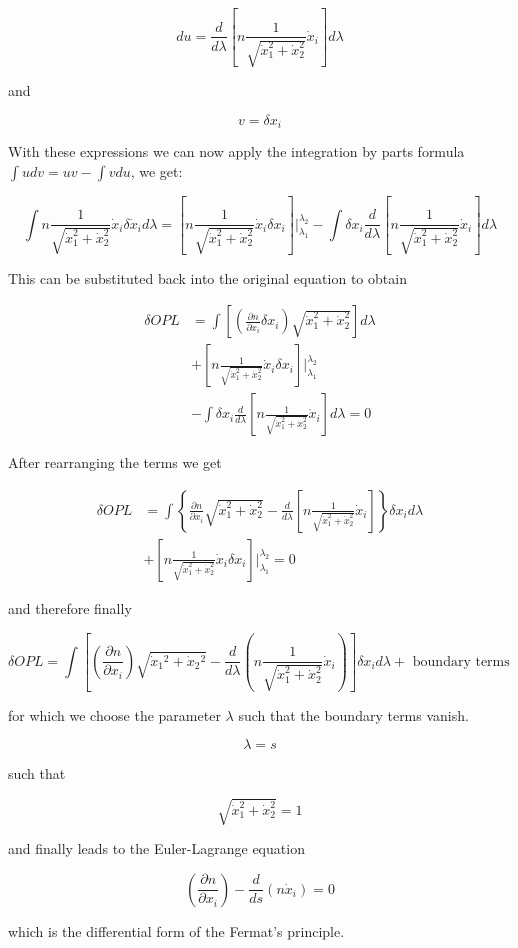 \documentclass[
  a4paper,
]{book}
\begin{document}
\begin{tcolorbox}
\[
du = \frac{d}{d\lambda}\left[n \frac{1}{\sqrt{\dot{x}_1^2+\dot{x}_2^2}} \dot{x}_i\right] d\lambda
\]

and

\[
v = \delta x_i
\]

With these expressions we can now apply the integration by parts formula
\(\int u dv = uv - \int v du\), we get:

\[
\int n \frac{1}{\sqrt{\dot{x}_1^2+\dot{x}_2^2}} \dot{x}_i \delta \dot{x}_i d\lambda = \left[n \frac{1}{\sqrt{\dot{x}_1^2+\dot{x}_2^2}} \dot{x}_i \delta x_i\right]|_{\lambda_1}^{\lambda_2} - \int \delta x_i \frac{d}{d\lambda}\left[n \frac{1}{\sqrt{\dot{x}_1^2+\dot{x}_2^2}} \dot{x}_i\right] d\lambda
\]

This can be substituted back into the original equation to obtain

\[
\begin{aligned}
\delta OPL &= \int \left[\left(\frac{\partial n}{\partial x_i} \delta x_i\right) \sqrt{\dot{x}_1^2+\dot{x}_2^2}\right] d\lambda \\
&+ \left[n \frac{1}{\sqrt{\dot{x}_1^2+\dot{x}_2^2}} \dot{x}_i \delta x_i\right]|_{\lambda_1}^{\lambda_2} \\
&- \int \delta x_i \frac{d}{d\lambda}\left[n \frac{1}{\sqrt{\dot{x}_1^2+\dot{x}_2^2}} \dot{x}_i\right] d\lambda = 0
\end{aligned}
\]

After rearranging the terms we get

\[
\begin{aligned}
\delta OPL &= \int \left\{\frac{\partial n}{\partial x_i} \sqrt{\dot{x}_1^2+\dot{x}_2^2} - \frac{d}{d\lambda}\left[n \frac{1}{\sqrt{\dot{x}_1^2+\dot{x}_2^2}} \dot{x}_i\right]\right\} \delta x_i d\lambda \\
&+ \left[n \frac{1}{\sqrt{\dot{x}_1^2+\dot{x}_2^2}} \dot{x}_i \delta x_i\right]|_{\lambda_1}^{\lambda_2} = 0
\end{aligned}
\]

and therefore finally

\[
\delta OPL=\int\left[\left(\frac{\partial n}{\partial x_i}\right) \sqrt{\dot{x}_1{ }^2+\dot{x}_2{ }^2}-\frac{d}{d \lambda}\left(n \frac{1}{\sqrt{\dot{x}_1^2+\dot{x}_2^2}} \dot{x}_i\right)\right] \delta x_i d \lambda+\text { boundary terms }
\]

for which we choose the parameter \(\lambda\) such that the boundary
terms vanish.

\[
\lambda=s
\]

such that

\[
\sqrt{\dot{x}_1^2+\dot{x}_2^2}=1
\]

and finally leads to the Euler-Lagrange equation

\[
\left(\frac{\partial n}{\partial x_i}\right)-\frac{d}{d s}\left(n \dot{x}_i\right)=0
\]

which is the differential form of the Fermat's principle.

\end{tcolorbox}
\end{document}
